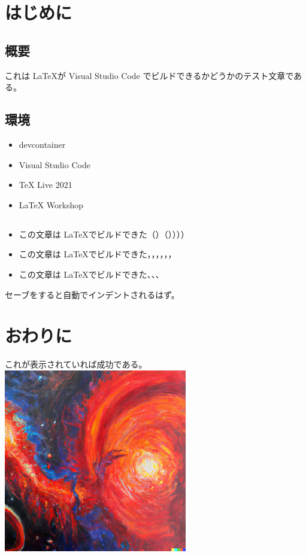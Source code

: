 \documentclass[12pt]{jreport}
\begin{document}
  \chapter{はじめに}
    \section{概要}
      これは \LaTeX が Visual Studio Code でビルドできるかどうかのテスト文章である。
		\section{環境}
			\begin{itemize}
				\item devcontainer
				\item Visual Studio Code
				\item TeX Live 2021
				\item LaTeX Workshop
			\end{itemize}
		\section{}
			\begin{itemize}
				\item この文章は \LaTeX でビルドできた（）（））））
				\item この文章は \LaTeX でビルドできた，，，，，，
				\item この文章は \LaTeX でビルドできた、、、
			\end{itemize}
			セーブをすると自動でインデントされるはず。
  \chapter{おわりに}
    これが表示されていれば成功である。
		\includegraphics*[width=8cm]{./images/photo.png}
\end{document}
